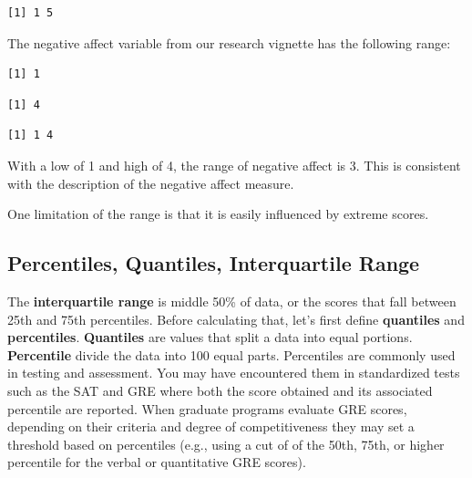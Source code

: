 \documentclass[
  11pt,
]{book}
\newenvironment{Shaded}{\begin{snugshade}}{\end{snugshade}}
\newcommand{\FunctionTok}[1]{\textcolor[rgb]{0.00,0.00,0.00}{#1}}
\newcommand{\NormalTok}[1]{#1}
\newcommand{\SpecialCharTok}[1]{\textcolor[rgb]{0.00,0.00,0.00}{#1}}
\begin{document}
\begin{verbatim}
[1] 1 5
\end{verbatim}

The negative affect variable from our research vignette has the following range:

\begin{Shaded}
\end{Shaded}

\begin{verbatim}
[1] 1
\end{verbatim}

\begin{Shaded}
\end{Shaded}

\begin{verbatim}
[1] 4
\end{verbatim}

\begin{Shaded}
\end{Shaded}

\begin{verbatim}
[1] 1 4
\end{verbatim}

With a low of 1 and high of 4, the range of negative affect is 3. This is consistent with the description of the negative affect measure.

One limitation of the range is that it is easily influenced by extreme scores.

\hypertarget{percentiles-quantiles-interquartile-range}{%
\subsection{Percentiles, Quantiles, Interquartile Range}\label{percentiles-quantiles-interquartile-range}}

The \textbf{interquartile range} is middle 50\% of data, or the scores that fall between 25th and 75th percentiles. Before calculating that, let's first define \textbf{quantiles} and \textbf{percentiles}. \textbf{Quantiles} are values that split a data into equal portions. \textbf{Percentile} divide the data into 100 equal parts. Percentiles are commonly used in testing and assessment. You may have encountered them in standardized tests such as the SAT and GRE where both the score obtained and its associated percentile are reported. When graduate programs evaluate GRE scores, depending on their criteria and degree of competitiveness they may set a threshold based on percentiles (e.g., using a cut of of the 50th, 75th, or higher percentile for the verbal or quantitative GRE scores).
\end{document}
